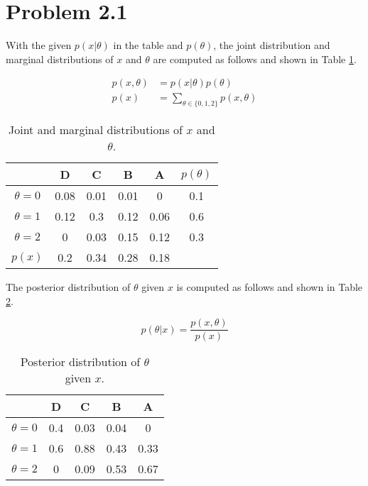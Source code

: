\section{Problem 2.1}
With the given $p(x \vert \theta)$ in the table and $p(\theta)$, the joint distribution and marginal distributions of $x$ and $\theta$ are computed as follows and shown in Table \ref{tab:2-1-joint}.

\begin{align*}
    p(x, \theta) &= p(x \vert \theta) p(\theta) \\
    p(x) &= \sum_{\theta \in \{0, 1, 2\}} p(x, \theta)
\end{align*}

\begin{table}[ht]
    \centering
    \begin{tabular}{c c c c c c}
    \toprule
    & D & C & B & A & $p(\theta)$ \\
    \midrule
    $\theta = 0$    & 0.08  & 0.01  & 0.01  & 0      & 0.1 \\
    $\theta = 1$    & 0.12  & 0.3   & 0.12  & 0.06   & 0.6 \\
    $\theta = 2$    & 0     & 0.03  & 0.15  & 0.12   & 0.3 \\
    $p(x)$          & 0.2   & 0.34  & 0.28  & 0.18   &\\
    \bottomrule
    \end{tabular}
    \caption{Joint and marginal distributions of $x$ and $\theta$.}
    \label{tab:2-1-joint}
\end{table}

The posterior distribution of $\theta$ given $x$ is computed as follows and shown in Table \ref{tab:2-1-post}.

\begin{equation*}
    p(\theta \vert x) = \frac{p(x, \theta)}{p(x)}
\end{equation*}

\begin{table}[ht]
    \centering
    \begin{tabular}{c c c c c}
    \toprule
    & D & C & B & A \\
    \midrule
    $\theta = 0$    & 0.4  & 0.03  & 0.04  & 0     \\
    $\theta = 1$    & 0.6  & 0.88  & 0.43  & 0.33  \\
    $\theta = 2$    & 0     & 0.09  & 0.53  & 0.67 \\
    \bottomrule
    \end{tabular}
    \caption{Posterior distribution of $\theta$ given $x$.}
    \label{tab:2-1-post}
\end{table}
